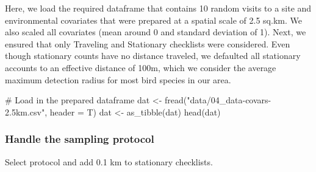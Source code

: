 \documentclass[
]{article}
\newenvironment{Shaded}{}{}
\newcommand{\CommentTok}[1]{\textcolor[rgb]{0.00,0.50,0.00}{#1}}
\newcommand{\DataTypeTok}[1]{#1}
\newcommand{\DecValTok}[1]{#1}
\newcommand{\FloatTok}[1]{#1}
\newcommand{\KeywordTok}[1]{\textcolor[rgb]{0.00,0.00,1.00}{#1}}
\newcommand{\NormalTok}[1]{#1}
\newcommand{\OperatorTok}[1]{#1}
\newcommand{\StringTok}[1]{\textcolor[rgb]{0.00,0.50,0.50}{#1}}
\begin{document}
Here, we load the required dataframe that contains 10 random visits to a site and environmental covariates that were prepared at a spatial scale of 2.5 sq.km. We also scaled all covariates (mean around 0 and standard deviation of 1). Next, we ensured that only Traveling and Stationary checklists were considered. Even though stationary counts have no distance traveled, we defaulted all stationary accounts to an effective distance of 100m, which we consider the average maximum detection radius for most bird species in our area.

\begin{Shaded}
\begin{Highlighting}[]
\CommentTok{# Load in the prepared dataframe}
\NormalTok{dat <-}\StringTok{ }\KeywordTok{fread}\NormalTok{(}\StringTok{"data/04_data-covars-2.5km.csv"}\NormalTok{, }\DataTypeTok{header =}\NormalTok{ T)}
\NormalTok{dat <-}\StringTok{ }\KeywordTok{as_tibble}\NormalTok{(dat)}
\KeywordTok{head}\NormalTok{(dat)}
\end{Highlighting}
\end{Shaded}

\hypertarget{handle-the-sampling-protocol}{%
\subsubsection{Handle the sampling protocol}\label{handle-the-sampling-protocol}}

Select protocol and add 0.1 km to stationary checklists.

\begin{Shaded}
\end{Shaded}
\end{document}
